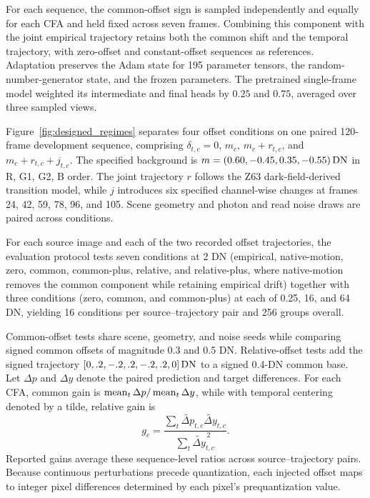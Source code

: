 For each sequence, the common-offset sign is sampled independently and equally for each CFA and held fixed across seven frames. Combining this component with the joint empirical trajectory retains both the common shift and the temporal trajectory, with zero-offset and constant-offset sequences as references. Adaptation preserves the Adam state for 195 parameter tensors, the random-number-generator state, and the frozen parameters. The pretrained single-frame model weighted its intermediate and final heads by $0.25$ and $0.75$, averaged over three sampled views.

Figure~\ref{fig:designed_regimes} separates four offset conditions on one paired 120-frame development sequence, comprising $\delta_{t,c}=0$, $m_c$, $m_c+r_{t,c}$, and $m_c+r_{t,c}+j_{t,c}$. The specified background is $m=(0.60,-0.45,0.35,-0.55)\,\mathrm{DN}$ in R, G1, G2, B order. The joint trajectory $r$ follows the Z63 dark-field-derived transition model, while $j$ introduces six specified channel-wise changes at frames 24, 42, 59, 78, 96, and 105. Scene geometry and photon and read noise draws are paired across conditions.


For each source image and each of the two recorded offset trajectories, the evaluation protocol tests seven conditions at 2 DN (empirical, native-motion, zero, common, common-plus, relative, and relative-plus, where native-motion removes the common component while retaining empirical drift) together with three conditions (zero, common, and common-plus) at each of 0.25, 16, and 64 DN, yielding 16 conditions per source--trajectory pair and 256 groups overall.

Common-offset tests share scene, geometry, and noise seeds while comparing signed common offsets of magnitude 0.3 and 0.5 DN. Relative-offset tests add the signed trajectory $[0,.2,-.2,.2,-.2,.2,0]\,\mathrm{DN}$ to a signed 0.4-DN common base. Let $\Delta p$ and $\Delta y$ denote the paired prediction and target differences. For each CFA, common gain is $\operatorname{mean}_t\Delta p/\operatorname{mean}_t\Delta y$, while with temporal centering denoted by a tilde, relative gain is
\begin{equation}
 g_c=\frac{\sum_t\widetilde{\Delta p}_{t,c}\widetilde{\Delta y}_{t,c}}
 {\sum_t\widetilde{\Delta y}_{t,c}^{\,2}}.
\end{equation}
Reported gains average these sequence-level ratios across source--trajectory pairs. Because continuous perturbations precede quantization, each injected offset maps to integer pixel differences determined by each pixel's prequantization value.

